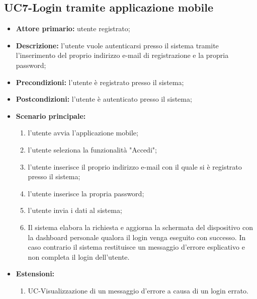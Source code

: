 \subsection{UC7-Login tramite applicazione mobile}
\begin{itemize}
	\item \textbf{Attore primario:} utente registrato;

	\item \textbf{Descrizione:} l'utente vuole autenticarsi presso il sistema tramite l'inserimento del proprio indirizzo e-mail di registrazione e la propria password;

	\item \textbf{Precondizioni:} l'utente è registrato presso il sistema;

	\item \textbf{Postcondizioni:} l'utente è autenticato presso il sistema;

	\item\textbf{Scenario principale:} 

	\begin{enumerate}
   		 \item l'utente avvia l'applicazione mobile;
    	 \item l'utente seleziona la funzionalità "Accedi";
 	     \item l'utente inserisce il proprio indirizzo e-mail con il quale si è registrato presso il sistema;
   	 	 \item l'utente inserisce la propria password; 
   		 \item l'utente invia i dati al sistema;
    	 \item Il sistema elabora la richiesta e aggiorna la schermata del dispositivo con la dashboard personale qualora il login venga eseguito con successo. In caso contrario il sistema restituisce un messaggio d'errore esplicativo e non completa il login dell'utente.
	\end{enumerate}
	\item \textbf{Estensioni:}
	\begin{enumerate}
    	\item UC-Visualizzazione di un messaggio d'errore a causa di un login errato.
	\end{enumerate}
\end{itemize}

